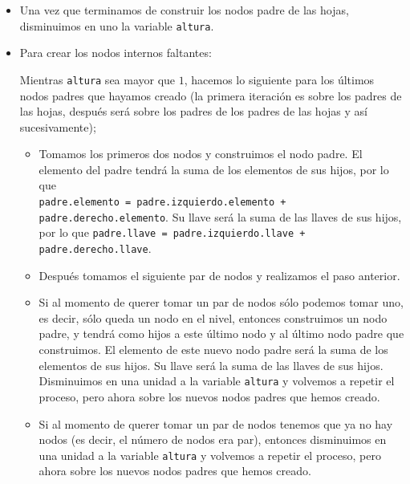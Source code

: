 \documentclass[letterpaper,11pt]{article}
\begin{document}
\begin{enumerate}
\begin{itemize}
\begin{itemize}
            \item Una vez que terminamos de construir los nodos padre de las
            hojas, disminuimos en uno la variable \texttt{altura}.

            \item Para crear los nodos internos faltantes:

            Mientras \texttt{altura} sea mayor que $1$, hacemos lo siguiente 
            para los últimos nodos padres que hayamos creado (la primera 
            iteración es sobre los padres de las hojas, después será sobre 
            los padres de los padres de las hojas y así sucesivamente); 
            \begin{itemize}
                \item Tomamos los primeros dos nodos y construimos el nodo 
                padre. El elemento del padre tendrá la suma de los elementos 
                de sus hijos, por lo que \\ 
                \texttt{padre.elemento = padre.izquierdo.elemento + 
                padre.derecho.elemento}. Su llave será la suma de las llaves 
                de sus hijos, por lo que \texttt{padre.llave = 
                padre.izquierdo.llave + padre.derecho.llave}.
    
                \item Después tomamos el siguiente par de nodos y realizamos 
                el paso anterior. 
                
                \item Si al momento de querer tomar un par de nodos sólo podemos 
                tomar uno, es decir, sólo queda un nodo en el nivel, entonces 
                construimos un nodo padre, y tendrá como hijos a este último nodo 
                y al último nodo padre que construimos. El elemento de este 
                nuevo nodo padre será la suma de los elementos de sus hijos. 
                Su llave será la suma de las llaves de sus hijos. Disminuimos 
                en una unidad a la variable \texttt{altura} y volvemos a repetir 
                el proceso, pero ahora sobre los nuevos nodos padres que hemos 
                creado.

                \item Si al momento de querer tomar un par de nodos tenemos 
                que ya no hay nodos (es decir, el número de nodos era par), 
                entonces disminuimos en una unidad a la variable \texttt{altura}
                y volvemos a repetir el proceso, pero ahora sobre los nuevos 
                nodos padres que hemos creado. 
            \end{itemize}


\end{itemize}
\end{itemize}
\end{enumerate}
\end{document}
